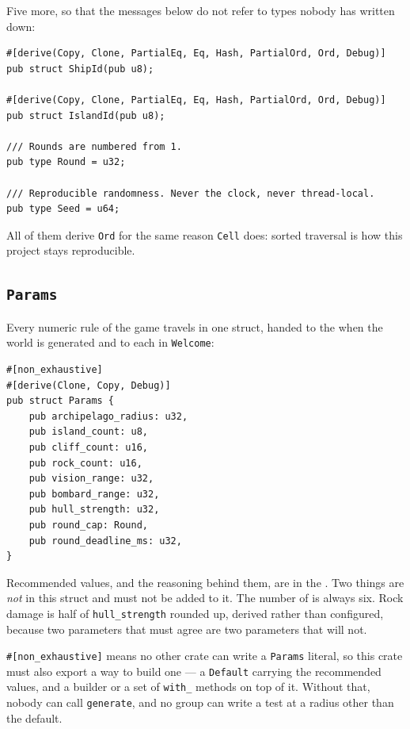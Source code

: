 \documentclass{article}
\begin{document}
Five more, so that the messages below do not refer to types nobody has written down:

\begin{lstlisting}
#[derive(Copy, Clone, PartialEq, Eq, Hash, PartialOrd, Ord, Debug)]
pub struct ShipId(pub u8);

#[derive(Copy, Clone, PartialEq, Eq, Hash, PartialOrd, Ord, Debug)]
pub struct IslandId(pub u8);

/// Rounds are numbered from 1.
pub type Round = u32;

/// Reproducible randomness. Never the clock, never thread-local.
pub type Seed = u64;
\end{lstlisting}

All of them derive \texttt{Ord} for the same reason \texttt{Cell} does: sorted traversal is how
this project stays reproducible.

\subsection{\texttt{Params}}
\label{proto:params}

Every numeric rule of the game travels in one struct, handed to the \chart{} when the world is
generated and to each \ship{} in \texttt{Welcome}:

\begin{lstlisting}
#[non_exhaustive]
#[derive(Clone, Copy, Debug)]
pub struct Params {
    pub archipelago_radius: u32,
    pub island_count: u8,
    pub cliff_count: u16,
    pub rock_count: u16,
    pub vision_range: u32,
    pub bombard_range: u32,
    pub hull_strength: u32,
    pub round_cap: Round,
    pub round_deadline_ms: u32,
}
\end{lstlisting}

Recommended values, and the reasoning behind them, are in the \MD. Two things are \emph{not} in
this struct and must not be added to it. The number of \ships{} is always six. Rock damage is
half of \texttt{hull\_strength} rounded up, derived rather than configured, because two parameters
that must agree are two parameters that will not.

\texttt{\#[non\_exhaustive]} means no other crate can write a \texttt{Params} literal, so this
crate must also export a way to build one --- a \texttt{Default} carrying the recommended values,
and a builder or a set of \texttt{with\_} methods on top of it. Without that, nobody can call
\texttt{generate}, and no group can write a test at a radius other than the default.
\end{document}
